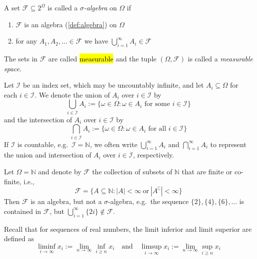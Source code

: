 \begin{definition}\label{def:sigma-algebra}
A set $\mathcal{F}\subseteq 2^\Omega$ is called a \emph{$\sigma$-algebra} on $\Omega$ if
\begin{enumerate}[label=(\roman*)]
  \item $\mathcal{F}$ is an algebra (\autoref{def:algebra}) on $\Omega$ \label{item:sigma-algebra-is-algebra}
  \item for any $A_1,A_2,\dots\in\mathcal{F}$ we have $\bigcup_{i=1}^{\infty} A_i \in \mathcal{F}$ \label{item:sigma-algebra-closed-under-countable-union}
\end{enumerate}
The sets in $\mathcal{F}$ are called \hl{measurable} and the tuple $(\Omega,\mathcal{F})$ is called a \emph{measurable space}.
\end{definition}

\begin{remark}
Let $\mathcal{I}$ be an index set, which may be uncountably infinite, and let $A_i\subseteq \Omega$ for each $i\in \mathcal{I}$.
We denote the union of $A_i$ over $i\in\mathcal{I}$ by
\[
  \bigcup_{i\in\mathcal{I}} A_i := \{\omega \in \Omega : \omega \in A_i \text{ for some } i \in \mathcal{I}\}
\]
and the intersection of $A_i$ over $i \in \mathcal{I}$ by
\[
  \bigcap_{i\in\mathcal{I}} A_i := \{\omega \in \Omega : \omega \in A_i \text{ for all } i \in \mathcal{I}\}
\]
If $\mathcal{I}$ is countable, e.g.\ $\mathcal{I} = \mathbb{N}$, we often write $\bigcup_{i=1}^{\infty}A_i$ and $\bigcap_{i=1}^{\infty} A_i$ to represent the union and intersection of $A_i$ over $i\in \mathcal{I}$, respectively.
\end{remark}

\begin{example}\label{ex:cofinite-algebra}
Let $\Omega = \mathbb{N}$ and denote by $\mathcal{F}$ the collection of subsets of $\mathbb{N}$ that are finite or co-finite, i.e.,
\[
  \mathcal{F} = \{A \subseteq \mathbb{N} : |A| < \infty \ \text{or}\ |A^\complement| < \infty\}
\]
Then $\mathcal{F}$ is an algebra, but not a $\sigma$-algebra,
e.g.\ the sequence $\{2\},\{4\},\{6\},\dots$ is contained in $\mathcal{F}$, but $\bigcup_{i=1}^{\infty} \{2i\} \notin \mathcal{F}$.
\end{example}

Recall that for sequences of real numbers, the limit inferior and limit superior are defined as
\[
  \liminf_{i\to\infty} x_i := \lim_{n\to\infty} \inf_{i\ge n} x_i
\quad\text{and}\quad
  \limsup_{i\to\infty} x_i := \lim_{n\to\infty} \sup_{i\ge n} x_i
\]

